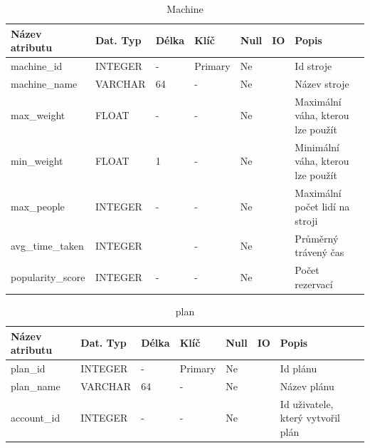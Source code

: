 \begin{table}[h!]
	\caption{Machine}
    \label{tab:dat-dictionary-machine}
	\begin{tabular}{|p{3.5cm}|p{2cm}|p{1cm}|p{2.5cm}|p{.75cm}|p{.5cm}|p{3.25cm}|}
		\hline
        \textbf{Název atributu} & \textbf{Dat. Typ} & \textbf{Délka} & \textbf{Klíč} & \textbf{Null} & \textbf{IO} & \textbf{Popis} \\
        \hline
            machine\_id & INTEGER   &  -    & Primary       & Ne &  & Id stroje \\
            \hline
            machine\_name     & VARCHAR   &  64   & -                 & Ne &  & Název stroje \\
            \hline
            max\_weight       & FLOAT   &  -   & -                 & Ne &  & Maximální váha, kterou lze použít \\
            \hline
            min\_weight       & FLOAT   &  1    & -                 & Ne &  & Minimální váha, kterou lze použít \\
            \hline
            max\_people       & INTEGER   &  -  & -                 & Ne &  & Maximální počet lidí na stroji \\
            \hline
            avg\_time\_taken    & INTEGER   &     & -                 & Ne &  & Průměrný trávený čas \\
            \hline
            popularity\_score & INTEGER      &  -    & -                 & Ne &  &  Počet rezervací \\
        \hline
	\end{tabular}
\end{table}

\begin{table}[h!]
	\caption{plan}
    \label{tab:dat-dictionary-plan}
	\begin{tabular}{|p{3.5cm}|p{2cm}|p{1cm}|p{2.5cm}|p{.75cm}|p{.5cm}|p{3.25cm}|}
		\hline
        \textbf{Název atributu} & \textbf{Dat. Typ} & \textbf{Délka} & \textbf{Klíč} & \textbf{Null} & \textbf{IO} & \textbf{Popis} \\
        \hline
            plan\_id & INTEGER   &  -    & Primary       & Ne &  & Id plánu \\
        \hline
            plan\_name     & VARCHAR   &  64   & -                 & Ne &  & Název plánu \\
        \hline
            account\_id     & INTEGER   &  -   & -                 & Ne &  & Id uživatele, který vytvořil plán \\
        \hline
	\end{tabular}
\end{table}

